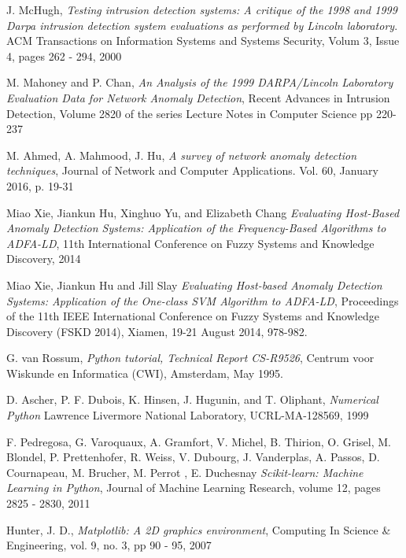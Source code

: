 \documentclass[reqno,openany,12pt]{amsbook}
\begin{document}
\begin{thebibliography}{99}
 J. McHugh, \emph{Testing intrusion detection systems: A critique of the 1998 and 1999 Darpa intrusion detection system evaluations as performed by Lincoln laboratory}. 
ACM Transactions on Information Systems and Systems Security, Volum 3, Issue 4, pages 262 - 294, 2000

 M. Mahoney and P. Chan, \emph{An Analysis of the 1999 DARPA/Lincoln Laboratory Evaluation Data for Network Anomaly Detection}, Recent Advances in Intrusion Detection,  Volume 2820 of the series Lecture Notes in Computer Science pp 220-237

 M. Ahmed, A. Mahmood, J. Hu, \emph{A survey of network anomaly detection techniques}, Journal of Network and Computer Applications. Vol. 60, January 2016, p. 19-31

 Miao Xie, Jiankun Hu, Xinghuo Yu, and Elizabeth Chang \emph{Evaluating Host-Based Anomaly Detection Systems: Application of the Frequency-Based Algorithms to ADFA-LD}, 11th International Conference on Fuzzy Systems and Knowledge Discovery, 2014

 Miao Xie, Jiankun Hu and Jill Slay \emph{Evaluating Host-based Anomaly Detection Systems:
Application of the One-class SVM Algorithm to ADFA-LD}, Proceedings of the 11th IEEE International Conference on Fuzzy Systems and Knowledge Discovery (FSKD 2014), Xiamen, 19-21 August 2014, 978-982. 

 G. van Rossum, \emph{Python tutorial, Technical Report CS-R9526}, Centrum voor Wiskunde en Informatica (CWI), Amsterdam, May 1995.

 D. Ascher, P. F. Dubois, K. Hinsen, J. Hugunin, and T. Oliphant,
\emph{Numerical Python} Lawrence Livermore National Laboratory, UCRL-MA-128569, 1999

 F. Pedregosa, G. Varoquaux, A. Gramfort, V. Michel, B. Thirion, O. Grisel, M. Blondel, P. Prettenhofer, R. Weiss, V. Dubourg, J. Vanderplas, A. Passos, D. Cournapeau, M. Brucher, M. Perrot , E. Duchesnay 
\emph{Scikit-learn: Machine Learning in Python}, Journal of Machine Learning Research, volume 12,
 pages 2825 - 2830, 2011

 Hunter, J. D., \emph{Matplotlib: A 2D graphics environment}, Computing In Science \& Engineering, vol. 9, no. 3, pp 90 - 95, 2007



\end{thebibliography}
\end{document}
